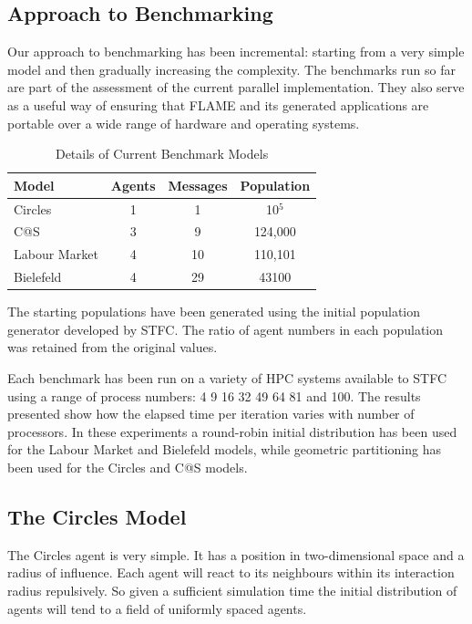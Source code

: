 \subsection{Approach to Benchmarking}
\label{sec:benchmarks}

Our approach to benchmarking has been incremental: starting from a very simple model and then gradually increasing the complexity. The benchmarks run so far are part of the assessment of the current parallel implementation. They also serve as a useful way of ensuring that FLAME and its generated applications are portable over a wide range of hardware and operating systems. 

\begin{table}[ht]
 \centering
  \begin{tabular}{l|ccc}
  Model     & Agents & Messages & Population   \\\hline
   Circles     &   1    &   1      &  10$^5$    \\
   C@S       &   3    &   9      &  124,000 \\
   Labour Market &   4    &   10     &  110,101 \\ 
   Bielefeld     &   4    &   29     &  43100     \\\hline
   \end{tabular}
   \caption{Details of Current Benchmark Models}
 \end{table}

The starting populations have been generated using the initial population generator developed by STFC. The ratio of agent numbers in each population was retained from the original values.

Each benchmark has been run on a variety of HPC systems available to STFC using a range of process numbers: 4 9 16 32 49 64 81 and 100. The results presented show how the elapsed time per iteration varies with number of processors. In these experiments a round-robin initial distribution has been used for the Labour Market and Bielefeld models, while geometric partitioning has been used for the Circles and C@S models.

\subsection{The Circles Model}

The Circles agent is very simple. It has a position in two-dimensional space and a radius of influence. Each agent will react to its neighbours within its interaction radius repulsively. So given a sufficient simulation time the initial distribution of agents will tend to a field of uniformly spaced agents.

